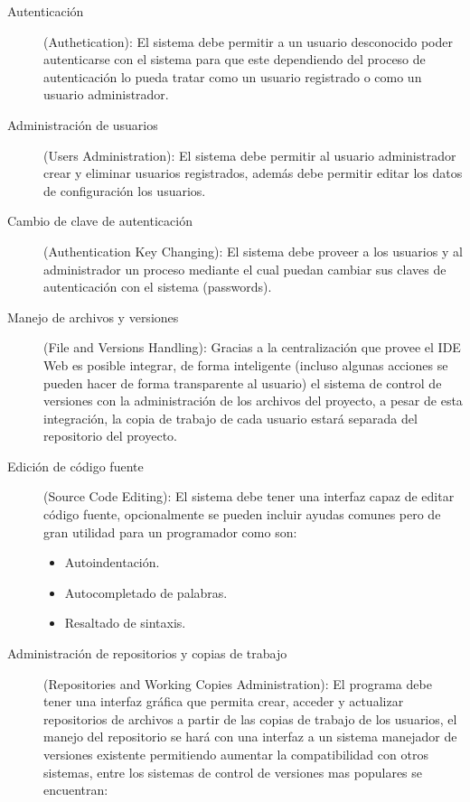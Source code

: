 \begin{description}
	
	\item [Autenticación] (Authetication): \newline
	El sistema debe permitir a un usuario desconocido poder autenticarse con el sistema para que este dependiendo del proceso de autenticación lo pueda tratar como un usuario registrado o como un usuario administrador.
	
	\item [Administración de usuarios] (Users Administration): \newline
	El sistema debe permitir al usuario administrador crear y eliminar usuarios registrados, además debe permitir editar los datos de configuración los usuarios.
	
	\item [Cambio de clave de autenticación] (Authentication Key Changing): \newline
	El sistema debe proveer a los usuarios y al administrador un proceso mediante el cual puedan cambiar sus claves de autenticación con el sistema (passwords).
	
	\item [Manejo de archivos y versiones] (File and Versions Handling): \newline
	Gracias a la centralización que provee el IDE Web es posible integrar, de forma inteligente (incluso algunas acciones se pueden hacer de forma transparente al usuario) el sistema de control de versiones con la administración de los archivos del proyecto, a pesar de esta integración, la copia de trabajo de cada usuario estará separada del repositorio del proyecto.
	
	\item [Edición de código fuente] (Source Code Editing): \newline
	El sistema debe tener una interfaz capaz de editar código fuente, opcionalmente se pueden incluir ayudas comunes pero de gran utilidad para un programador como son:
	
	\begin{itemize}
		\item Autoindentación.
		\item Autocompletado de palabras.
		\item Resaltado de sintaxis.
	\end{itemize}
	
	\item [Administración de repositorios y copias de trabajo] (Repositories and Working Copies Administration): \newline
	El programa debe tener una interfaz gráfica que permita crear, acceder y actualizar repositorios de archivos a partir de las copias de trabajo de los usuarios, el manejo del repositorio se hará con una interfaz a un sistema manejador de versiones existente permitiendo aumentar la compatibilidad con otros sistemas, entre los sistemas de control de versiones mas populares se encuentran:
	

\end{description}
